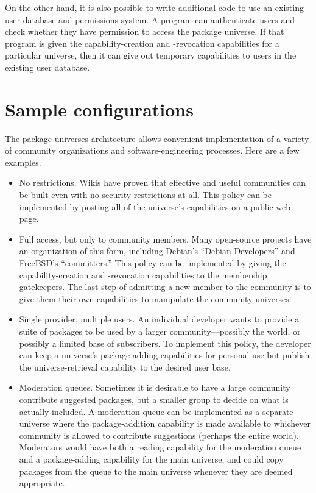 \documentclass{article}
\begin{document}
On the other hand, it is also possible to write additional code to use
an existing user database and permissions system.  A program can
authenticate users and check whether they have permission to access
the package universe.  If that program is given the
capability-creation and -revocation capabilities for a particular
universe, then it can give out temporary capabilities to users in the
existing user database.


\section{Sample configurations}
The package universes architecture allows convenient implementation of
a variety of community organizations and software-engineering
processes.  Here are a few examples.
\begin{itemize}
\item No restrictions.  Wikis have proven that effective and useful
      communities can be built even with no security restrictions at
      all.  This policy can be implemented by posting all of the
      universe's capabilities on a public web page.

\item Full access, but only to community members.  Many open-source
      projects have an organization of this form, including Debian's
      ``Debian Developers'' and FreeBSD's ``committers.''  This policy
      can be implemented by giving the capability-creation and
      -revocation capabilities to the membership gatekeepers.
      The last step of admitting a new member to the community is to
      give them their own capabilities to manipulate the community
      universes.

\item Single provider, multiple users.  An individual developer wants
      to provide a suite of packages to be used by a larger
      community---possibly the world, or possibly a limited base of
      subscribers.  To implement this policy, the developer can keep a
      universe's package-adding capabilities for personal use but
      publish the universe-retrieval capability to the desired
      user base.

\item Moderation queues.  Sometimes it is desirable to have a large
      community contribute suggested packages, but a smaller group to
      decide on what is actually included.  A moderation queue can be
      implemented as a separate universe where the package-addition
      capability is made available to whichever community is allowed
      to contribute suggestions (perhaps the entire world).
      Moderators would have both a reading capability for the
      moderation queue and a package-adding capability for the main
      universe, and could copy packages from the queue to the main
      universe whenever they are deemed appropriate.



\end{itemize}
\end{document}
